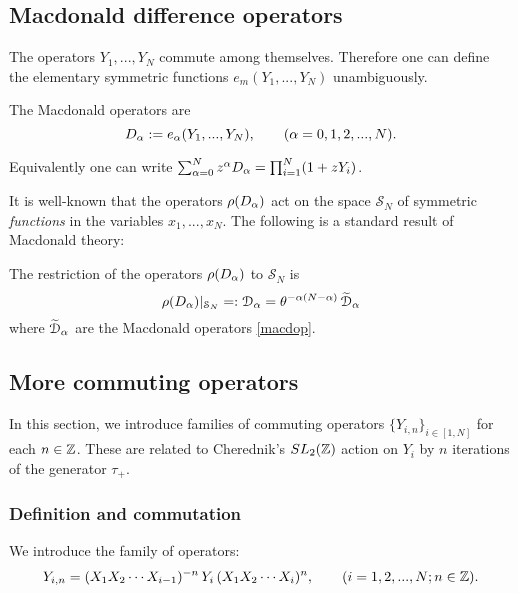 \subsection{Macdonald difference operators}

The operators $Y_1,...,Y_{N}$ commute among themselves. Therefore one can define
the elementary symmetric functions $e_m(Y_1,...,Y_{N})$ unambiguously. 
\begin{defn} The Macdonald operators are
\begin{equation}\label{orimac}
{D}_{\alpha}:=e_{\alpha}(Y_1,...,Y_{N}),\qquad ({\alpha}=0,1,2,...,N). \end{equation}
\end{defn}
Equivalently one can write
$\sum_{{\alpha}=0}^{N} z^{\alpha} {D}_{\alpha}=\prod_{i=1}^{N} (1+z Y_i)$.

It is well-known that the operators  $\rho({D}_{\alpha})$ act on the space ${\mathcal S}_N$  of symmetric {\it functions} in the variables $x_1,...,x_{N}$.
The following is a standard result of Macdonald theory:
\begin{thm}\label{macdopthm}
The restriction of the operators $\rho({D}_{\alpha})$ to ${\mathcal S}_N$ is
$$\rho({D}_{\alpha})\vert_{{\mathcal S}_N}=:{\mathcal D}_{\alpha}=\theta^{-{\alpha}(N-{\alpha})}\, \widetilde{\mathcal D}_{{\alpha}}$$
where $\widetilde{\mathcal D}_{\alpha}$ are the Macdonald operators \eqref{macdop}.
\end{thm}


\subsection{More commuting operators}

In this section, we introduce families of commuting operators $\{Y_{i,n}\}_{i\in [1,N]}$ for each $n\in {\mathbb Z}$. These are related
to Cherednik's $SL_2({\mathbb Z})$ action on $Y_i$ by $n$ iterations of the generator $\tau_+$.

\subsubsection{Definition and commutation}

\begin{defn}
We introduce the family of operators:
$$
{Y}_{i,n} = (X_1 X_2 \cdots X_{i-1})^{-n}\, Y_i \, (X_1 X_2 \cdots X_i)^n ,\qquad (i=1,2,...,N;n\in {\mathbb Z}).
$$
\end{defn}


